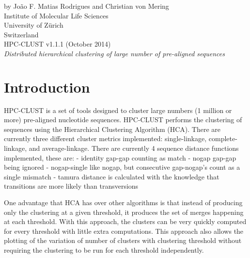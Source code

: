 \documentclass[10pt,a4paper]{article}
\begin{document}
 

\pagestyle{empty} %

{
 \raggedleft %
 \vspace*{\baselineskip} %
 {\Large by Jo\~ao F. Matias Rodrigues and Christian von Mering\\
 Institute of Molecular Life Sciences\\University of Z\"urich\\Switzerland}\\[0.167\textheight] %
 {\Huge HPC-CLUST v1.1.1 (October 2014)}\\[\baselineskip] %
 {\Large \textit{Distributed hierarchical clustering of large number of pre-aligned sequences}}\par %
}
\vfill %
\vspace*{3\baselineskip} %

\newpage

\tableofcontents
\newpage
{}

\section{Introduction}

HPC-CLUST is a set of tools designed to cluster large numbers (1 million or more)
pre-aligned nucleotide sequences. HPC-CLUST performs the clustering of sequences
using the Hierarchical Clustering Algorithm (HCA). There are currently three different
cluster metrics implemented: single-linkage, complete-linkage, and average-linkage.
There are currently 4 sequence distance functions implemented, these are:
- identity
    gap-gap counting as match
- nogap
    gap-gap being ignored
- nogap-single
    like nogap, but consecutive gap-nogap's count as a single mismatch
- tamura
    distance is calculated with the knowledge that transitions are more likely than
   transversions

One advantage that HCA has over other algorithms is that instead of producing only the
clustering at a given threshold, it produces the set of merges happening at each threshold.
With this approach, the clusters can be very quickly computed for every threshold with
little extra computations. This approach also allows the plotting of the variation of
number of clusters with clustering threshold without requiring the clustering to be run
for each threshold independently.
\end{document}
